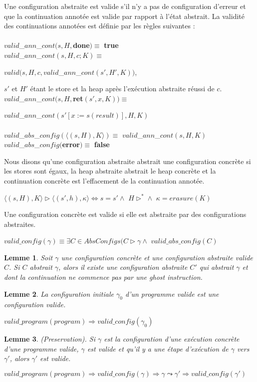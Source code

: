 \documentclass[9pt,openany]{book}
\newtheorem{lemme}{Lemme}
\begin{document}
		Une configuration abstraite est valide s'il n'y a pas de configuration d'erreur et que la continuation annot\'ee est valide par rapport \`a l'\'etat abstrait. La validit\'e des continuations annot\'ees est d\'efinie par les r\`egles suivantes :\\ \\  
		$valid$_$ann$_$cont(s,H,$\textbf{done}$) \equiv$ \textbf{true}\\
		$valid$_$ann$_$cont(s,H,c;K)\equiv$ \par
		$valid(s,H,c,valid$_$ann$_$cont(s',H',K))$,\par $s'$ et $H'$ \'etant le store et la heap apr\`es l'ex\'ecution abstraite r\'eussi de $c$.\\
		$valid$_$ann$_$cont(s,H,$\textbf{ret}$(s',x,K))\equiv$\par
		$valid$_$ann$_$cont(s'[x:=s(result)],H,K)$\\ \\
		$valid$_$abs$_$config(\langle (s,H),K\rangle)\equiv$ $valid$_$ann$_$cont(s,H,K)$\\
		$valid$_$abs$_$config($\textbf{error}$)\equiv$ \textbf{false}\\ \par 
		Nous disons qu'une configuration abstraite abstrait une configuration concr\`ete si les stores sont \'egaux, la heap abstraite abstrait le heap concr\`ete et la continuation concr\`ete est l'effacement de la continuation annot\'ee.
		\begin{center}
		$\langle (s,H),K\rangle\rhd\langle(s',h),\kappa\rangle\Leftrightarrow s=s'\land$ $H\rhd^*\land$ $\kappa = erasure(K)$
		\end{center}
		Une configuration concr\`ete est valide si elle est abstraite par des configurations abstraites.
		\begin{center}
		$valid\_config(\gamma)\equiv\exists C\in AbsConfigs (C\rhd\gamma\land$ $valid\_abs\_config(C)$
		\end{center}
		\begin{lemme}
			Soit $\gamma$ une configuration concr\`ete et une configuration abstraite valide $C$. Si $C$ abstrait $\gamma$, alors il existe une configuration abstraite $C'$ qui abstrait $\gamma$ et dont la continuation ne commence pas par une ghost instruction.
		\end{lemme}
		\begin{lemme}
			La configuration initiale $\gamma_0$ d'un programme valide est une configuration valide.
			\begin{center}
			$valid\_program(program)\Rightarrow valid\_config(\gamma_0)$
			\end{center}
		\end{lemme}
		\begin{lemme}
			(Preservation). Si $\gamma$ est la configuration d'une ex\'ecution concr\`ete d'une programme valide, $\gamma$ est valide et qu'il y a une \'etape d'ex\'ecution de $\gamma$ vers $\gamma '$, alors $\gamma '$ est valide.
			\begin{center}
			$valid\_program(program)\Rightarrow valid\_config(\gamma)\Rightarrow \gamma\leadsto\gamma '\Rightarrow valid\_config(\gamma ')$
			\end{center}
		\end{lemme}
	
\end{document}
